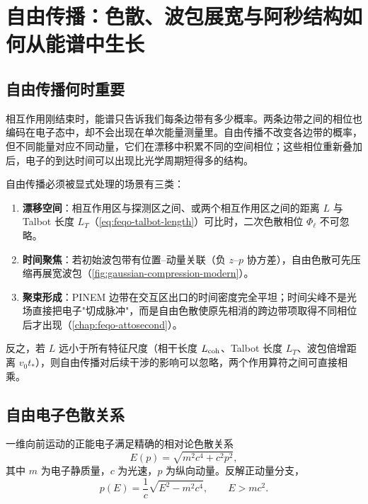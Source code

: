 \section{自由传播：色散、波包展宽与阿秒结构如何从能谱中生长}
\label{chap:feqo-free-propagation}

\subsection{自由传播何时重要}

相互作用刚结束时，能谱只告诉我们每条边带有多少概率。两条边带之间的相位也编码在电子态中，却不会出现在单次能量测量里。自由传播不改变各边带的概率，但不同能量对应不同动量，它们在漂移中积累不同的空间相位；这些相位重新叠加后，电子的到达时间可以出现比光学周期短得多的结构。

自由传播必须被显式处理的场景有三类：

\begin{enumerate}
\item \textbf{漂移空间}：相互作用区与探测区之间、或两个相互作用区之间的距离 $L$ 与 Talbot 长度 $L_T$（\cref{eq:feqo-talbot-length}）可比时，二次色散相位 $\Phi_\ell$ 不可忽略。
\item \textbf{时间聚焦}：若初始波包带有位置--动量关联（负 $z$--$p$ 协方差），自由色散可先压缩再展宽波包（\cref{fig:gaussian-compression-modern}）。
\item \textbf{聚束形成}：PINEM 边带在交互区出口的时间密度完全平坦；时间尖峰不是光场直接把电子"切成脉冲"，而是自由色散使原先相消的跨边带项取得不同相位后才出现（\cref{chap:feqo-attosecond}）。
\end{enumerate}

反之，若 $L$ 远小于所有特征尺度（相干长度 $L_{\rm coh}$、Talbot 长度 $L_T$、波包倍增距离 $v_0 t_*$），则自由传播对后续干涉的影响可以忽略，两个作用算符之间可直接相乘。

\subsection{自由电子色散关系}

一维向前运动的正能电子满足精确的相对论色散关系
\begin{equation}
E(p)=\sqrt{m^2c^4+c^2p^2},
\label{eq:feqo-free-dispersion}
\end{equation}
其中 $m$ 为电子静质量，$c$ 为光速，$p$ 为纵向动量。反解正动量分支，
\begin{equation}
p(E)=\frac{1}{c}\sqrt{E^2-m^2c^4},\qquad E>mc^2.
\label{eq:feqo-momentum-from-energy}
\end{equation}

